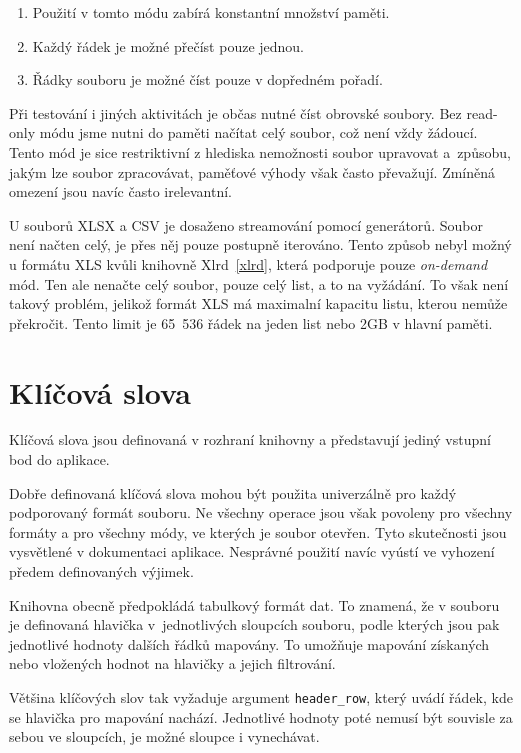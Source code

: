 \begin{enumerate}
    \item Použití v tomto módu zabírá konstantní množství paměti.
    \item Každý řádek je možné přečíst pouze jednou.
    \item Řádky souboru je možné číst pouze v dopředném pořadí.
\end{enumerate}

Při testování i jiných aktivitách je občas nutné číst obrovské soubory. Bez read-only módu jsme nutni do paměti načítat celý soubor, což není vždy žádoucí. Tento mód je sice restriktivní z hlediska nemožnosti soubor upravovat a~způsobu, jakým lze soubor zpracovávat, paměťové výhody však často převažují. Zmíněná omezení jsou navíc často irelevantní. 

U souborů XLSX a CSV je dosaženo streamování pomocí generátorů. Soubor není načten celý, je přes něj pouze postupně iterováno. Tento způsob nebyl možný u formátu XLS kvůli knihovně Xlrd~\ref{xlrd}, která podporuje pouze \textit{on-demand} mód. Ten ale nenačte celý soubor, pouze celý list, a to na vyžádání. To však není takový problém, jelikož formát XLS má maximalní kapacitu listu, kterou nemůže překročit. Tento limit je 65~536 řádek na jeden list nebo 2GB v hlavní paměti.~\cite{xlsLimit}~\cite{XlsLimit2}

\section{Klíčová slova}

Klíčová slova jsou definovaná v rozhraní knihovny a představují jediný vstupní bod do aplikace. 

Dobře definovaná klíčová slova mohou být použita univerzálně pro každý podporovaný formát souboru. Ne všechny operace jsou však povoleny pro všechny formáty a pro všechny módy, ve kterých je soubor otevřen. Tyto skutečnosti jsou vysvětlené v dokumentaci aplikace. Nesprávné použití navíc vyústí ve vyhození předem definovaných výjimek.

Knihovna obecně předpokládá tabulkový formát dat. To znamená, že v souboru je definovaná hlavička v~jednotlivých sloupcích souboru, podle kterých jsou pak jednotlivé hodnoty dalších řádků mapovány. To umožňuje mapování získaných nebo vložených hodnot na hlavičky a jejich filtrování.

Většina klíčových slov tak vyžaduje argument \texttt{header\_row}, který uvádí řádek, kde se hlavička pro mapování nachází. Jednotlivé hodnoty poté nemusí být souvisle za sebou ve sloupcích, je možné sloupce i vynechávat.


